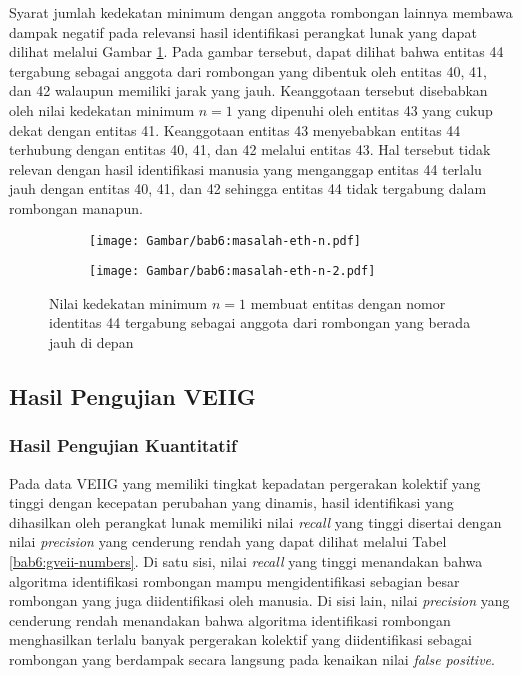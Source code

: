 Syarat jumlah kedekatan minimum dengan anggota rombongan lainnya membawa dampak negatif pada relevansi hasil identifikasi perangkat lunak yang dapat dilihat melalui Gambar \ref{bab6:masalah-eth-n}. Pada gambar tersebut, dapat dilihat bahwa entitas 44 tergabung sebagai anggota dari rombongan yang dibentuk oleh entitas 40, 41, dan 42 walaupun memiliki jarak yang jauh. Keanggotaan tersebut disebabkan oleh nilai kedekatan minimum $n = 1$ yang dipenuhi oleh entitas 43 yang cukup dekat dengan entitas 41. Keanggotaan entitas 43 menyebabkan entitas 44 terhubung dengan entitas 40, 41, dan 42 melalui entitas 43. Hal tersebut tidak relevan dengan hasil identifikasi manusia yang menganggap entitas 44 terlalu jauh dengan entitas 40, 41, dan 42 sehingga entitas 44 tidak tergabung dalam rombongan manapun.

\begin{figure}[h]
    \centering
    \captionsetup{width=.6\textwidth}
    \begin{subfigure}[t]{0.175\textwidth}
        \centering
        \texttt{[image: Gambar/bab6:masalah-eth-n.pdf]}
    \end{subfigure}
    \begin{subfigure}[t]{0.175\textwidth}
        \centering
        \texttt{[image: Gambar/bab6:masalah-eth-n-2.pdf]}
    \end{subfigure}
    \caption[Masalah nilai $n$ pada data BIWI ETH]{Nilai kedekatan minimum $n = 1$ membuat entitas dengan nomor identitas 44 tergabung sebagai anggota dari rombongan yang berada jauh di depan}
    \label{bab6:masalah-eth-n}
\end{figure}

\subsection{Hasil Pengujian VEIIG}
\label{subsec:veiig-result}

\subsubsection{Hasil Pengujian Kuantitatif}
\label{subsubsec:veiig-quantitative}

Pada data VEIIG yang memiliki tingkat kepadatan pergerakan kolektif yang tinggi dengan kecepatan perubahan yang dinamis, hasil identifikasi yang dihasilkan oleh perangkat lunak memiliki nilai \textit{recall} yang tinggi disertai dengan nilai \textit{precision} yang cenderung rendah yang dapat dilihat melalui Tabel \ref{bab6:gveii-numbers}. Di satu sisi, nilai \textit{recall} yang tinggi menandakan bahwa algoritma identifikasi rombongan mampu mengidentifikasi sebagian besar rombongan yang juga diidentifikasi oleh manusia. Di sisi lain, nilai \textit{precision} yang cenderung rendah menandakan bahwa algoritma identifikasi rombongan menghasilkan terlalu banyak pergerakan kolektif yang diidentifikasi sebagai rombongan yang berdampak secara langsung pada kenaikan nilai \textit{false positive}.

